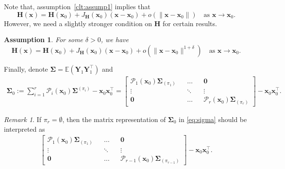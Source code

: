 \documentclass[12pt]{amsart}
\theoremstyle{plain}
\newtheorem{assumption}[theorem]{Assumption}
\theoremstyle{remark}
\newtheorem{remark}[theorem]{Remark}
\numberwithin{equation}{section}
\begin{document}
Note that, assumption~\ref{clt:assump1} implies that
\[
\boldsymbol{H}(\boldsymbol{x}) = \boldsymbol{H}(\boldsymbol{x}_0) + J_{\boldsymbol{H}}\left(\boldsymbol{x}_0\right)\left(\boldsymbol{x} - \boldsymbol{x}_0\right) + o\left(\|\boldsymbol{x} - \boldsymbol{x}_0\|\right) \quad \text{as } \boldsymbol{x} \to \boldsymbol{x}_0.
\]
However, we need a slightly stronger condition on $\boldsymbol{H}$ for certain results.
\begin{assumption}\label{clt:assump2} For some $\delta > 0$, we have
    \[\boldsymbol{H}(\boldsymbol{x}) = \boldsymbol{H}(\boldsymbol{x}_0) + J_{\boldsymbol{H}}\left(\boldsymbol{x}_0\right)\left(\boldsymbol{x} - \boldsymbol{x}_0\right)  + o\left(\|\boldsymbol{x} - \boldsymbol{x}_0\|^{1+\delta}\right) \quad \text{as } \boldsymbol{x} \to \boldsymbol{x}_0.\] 
\end{assumption}

Finally, denote $\boldsymbol{\Sigma} = \mathbb{E}\left(\boldsymbol{Y}_1\boldsymbol{Y}^{\top}_1\right)$ and 
\begin{align}\label{eq:sigma}
   \boldsymbol{\Sigma}_0 := \sum_{i=1}^{r}\mathcal{P}_i(\boldsymbol{x}_0)\boldsymbol{\Sigma}^{(\pi_i)}
   - \boldsymbol{x}_0\boldsymbol{x}^{\top}_0 = \begin{bmatrix}
       \mathcal{P}_1(\boldsymbol{x}_0)\boldsymbol{\Sigma}_{(\pi_1)} && \ldots && \boldsymbol{0} 
       \\ \vdots && \ddots && \vdots
       \\ \boldsymbol{0} && \ldots && \mathcal{P}_r(\boldsymbol{x}_0)\boldsymbol{\Sigma}_{(\pi_r)}
   \end{bmatrix} - \boldsymbol{x}_0\boldsymbol{x}^{\top}_0.
\end{align}

\begin{remark}
If $\pi_r = \emptyset$, then the matrix representation of $\boldsymbol{\Sigma}_0$ in \eqref{eq:sigma} should be interpreted as 
\begin{align*}\begin{bmatrix}
       \mathcal{P}_1(\boldsymbol{x}_0)\boldsymbol{\Sigma}_{(\pi_1)} && \ldots && \boldsymbol{0} 
       \\ \vdots && \ddots && \vdots
       \\ \boldsymbol{0} && \ldots && \mathcal{P}_{r-1}(\boldsymbol{x}_0)\boldsymbol{\Sigma}_{(\pi_{r-1})}
   \end{bmatrix} - \boldsymbol{x}_0\boldsymbol{x}^{\top}_0.
\end{align*}
\end{remark}
\end{document}
